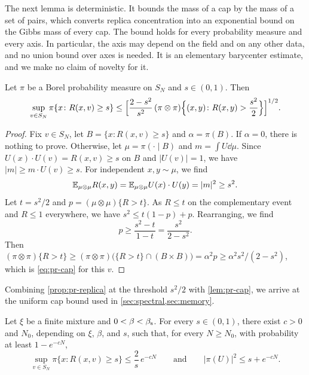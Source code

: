 The next lemma is deterministic. It bounds the mass of a cap by the mass of a set of pairs, which converts replica concentration into an exponential bound on the Gibbs mass of every cap. The bound holds for every probability measure and every axis. In particular, the axis may depend on the field and on any other data, and no union bound over axes is needed. It is an elementary barycenter estimate, and we make no claim of novelty for it.

\begin{lemma}\label{lem:pr-cap}
Let $\pi$ be a Borel probability measure on $S_N$ and $s\in(0,1)$. Then
\begin{equation}\label{eq:pr-cap}
\sup_{v\in S_N}\pi\{x\colon R(x,v)\ge s\}\le\Bigl[\frac{2-s^2}{s^2}\,(\pi\otimes\pi)\Bigl\{(x,y)\colon R(x,y)>\frac{s^2}2\Bigr\}\Bigr]^{1/2}.
\end{equation}
\end{lemma}

\begin{proof}
Fix $v\in S_N$, let $B=\{x\colon R(x,v)\ge s\}$ and $\alpha=\pi(B)$. If $\alpha=0$, there is nothing to prove. Otherwise, let $\mu=\pi(\cdot\mid B)$ and $m=\int U\dd\mu$. Since $U(x)\cdot U(v)=R(x,v)\ge s$ on $B$ and $|U(v)|=1$, we have $|m|\ge m\cdot U(v)\ge s$. For independent $x,y\sim\mu$, we find
\[
\mathbb E_{\mu\otimes\mu}R(x,y)=\mathbb E_{\mu\otimes\mu}U(x)\cdot U(y)=|m|^2\ge s^2 .
\]
Let $t=s^2/2$ and $p=(\mu\otimes\mu)\{R>t\}$. As $R\le t$ on the complementary event and $R\le1$ everywhere, we have $s^2\le t(1-p)+p$. Rearranging, we find
\[
p\ge\frac{s^2-t}{1-t}=\frac{s^2}{2-s^2}.
\]
Then $(\pi\otimes\pi)\{R>t\}\ge(\pi\otimes\pi)\bigl(\{R>t\}\cap(B\times B)\bigr)=\alpha^2p\ge\alpha^2s^2/(2-s^2)$, which is \eqref{eq:pr-cap} for this $v$.
\end{proof}

Combining \cref{prop:pr-replica} at the threshold $s^2/2$ with \cref{lem:pr-cap}, we arrive at the uniform cap bound used in \cref{sec:spectral,sec:memory}.

\begin{corollary}\label{cor:pr-cap}
Let $\xi$ be a finite mixture and $0<\beta<\beta_{\mathrm s}$. For every $s\in(0,1)$, there exist $c>0$ and $N_0$, depending on $\xi$, $\beta$, and $s$, such that, for every $N\ge N_0$, with probability at least $1-e^{-cN}$,
\begin{equation}\label{eq:pr-uniform-cap}
\sup_{v\in S_N}\pi\{x\colon R(x,v)\ge s\}\le\frac2s\,e^{-cN}
\qquad\text{and}\qquad
|\pi(U)|^2\le s+e^{-cN}.
\end{equation}
\end{corollary}

